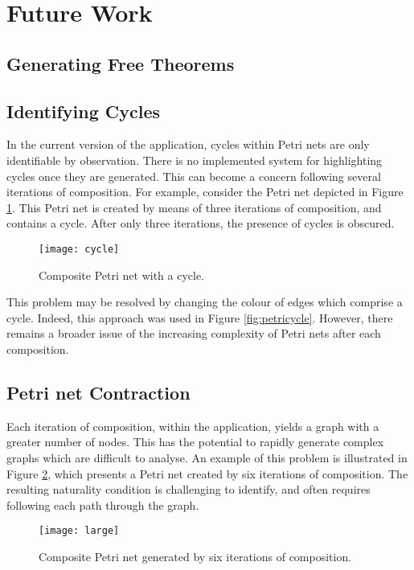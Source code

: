 \documentclass[../Dissertation.tex]{subfiles}
\begin{document}
\section{Future Work}

\subsection{Generating Free Theorems}

\subsection{Identifying Cycles}
In the current version of the application, cycles within Petri nets are only identifiable by observation. There is no implemented system for highlighting cycles once they are generated. This can become a concern following several iterations of composition. For example, consider the Petri net depicted in Figure \ref{fig:cycle}. This Petri net is created by means of three iterations of composition, and contains a cycle. After only three iterations, the presence of cycles is obscured.

\begin{figure}[H]
\begin{center}
\texttt{[image: cycle]}
\end{center}
\caption{Composite Petri net with a cycle.}
\label{fig:cycle}
\end{figure}

This problem may be resolved by changing the colour of edges which comprise a cycle. Indeed, this approach was used in Figure \ref{fig:petricycle}. However, there remains a broader issue of the increasing complexity of Petri nets after each composition.

\subsection{Petri net Contraction}
Each iteration of composition, within the application, yields a graph with a greater number of nodes. This has the potential to rapidly generate complex graphs which are difficult to analyse. An example of this problem is illustrated in Figure \ref{fig:large}, which presents a Petri net created by six iterations of composition. The resulting naturality condition is challenging to identify, and often requires following each path through the graph.

\begin{figure}[H]
\begin{center}
\texttt{[image: large]}
\end{center}
\caption{Composite Petri net generated by six iterations of composition.}
\label{fig:large}
\end{figure}
\end{document}
